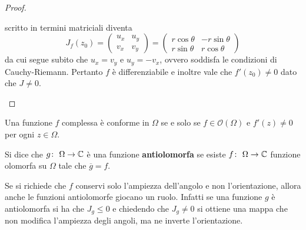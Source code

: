 \begin{proof}
\begin{enumerate}
\begin{equation*}
      \end{equation*}
      scritto in termini matriciali diventa
      \begin{equation*}
        J_f(z_0) = \left( 
          \begin{array}{cc}
          u_x & u_y \\
          v_x & v_y 
          \end{array}\right) = 
          \left( 
            \begin{array}{cc}
              r\cos\theta & -r\sin\theta \\
              r\sin\theta & r\cos\theta 
            \end{array}
          \right)
      \end{equation*}
      da cui segue subito che $u_x = v_y$ e $u_y = - v_x$, ovvero soddisfa le
      condizioni di Cauchy-Riemann. Pertanto $f$ è differenziabile e inoltre
      vale che $f'(z_0) \neq 0$ dato che $J \neq 0$.
  \end{enumerate}
\end{proof}

\begin{corollary}
  Una funzione $f$ complessa è conforme in $\Omega$ se e solo se $f \in
  \mathcal{O}(\Omega)$ e $f'(z) \neq 0$ per ogni $z \in \Omega$. 
  \label{cor:estensione_teorema_conformita}
\end{corollary}

\begin{definition}
  Si dice che $g \colon\ \Omega \rightarrow \mathbb{C}$ è una funzione \textbf{antiolomorfa} se
  esiste $f \colon\ \Omega \rightarrow \mathbb{C}$ funzione olomorfa su $\Omega$ tale che
  $\overline{g} = f$.
  \label{def:antiolomorfa}
\end{definition}

\begin{remark}
  Se si richiede che $f$ conservi solo l'ampiezza dell'angolo e non
  l'orientazione, allora anche le funzioni antiolomorfe giocano un ruolo.
  Infatti se una funzione $g$ è antiolomorfa si ha che $J_g \le 0$ e chiedendo
  che $J_g \neq 0$ si ottiene una mappa che non modifica l'ampiezza degli
  angoli, ma ne inverte l'orientazione.  
  \label{rmk:anticonformita}
\end{remark}

